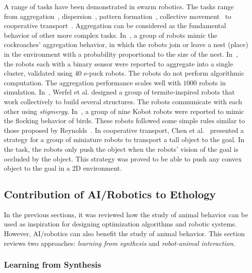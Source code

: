 A range of tasks have been demonstrated in swarm robotics. The tasks range from aggregation~\cite{Trianni:LNCS:2003, Gauci2014_ijrr, Garnier:AL:2008, Jeanson:AB:2005}, dispersion~\cite{howard2002mobile, mclurkin2004distributed}, pattern formation~\cite{Fujibayashi:DARS:2002, Chen:AAMAS:2012}, collective movement~\cite{Turgut:SI:2008} to cooperative transport~\cite{Kube:AB:1993, Kube:RAS:2000,Gross:IJBC:2009, Jianing:TRO:2015}. Aggregation can be considered as the fundamental behavior of other more complex tasks. In~\cite{Jeanson:AB:2005}, a group of robots mimic the cockroaches' aggregation behavior, in which the robots join or leave a nest (place) in the environment with a probability proportional to the size of the nest. In~\cite{Gauci2014_ijrr}, the robots each with a binary sensor were reported to aggregate into a single cluster, validated using $40$ e-puck robots. The robots do not perform algorithmic computation. The aggregation performance scales well with $1000$ robots in simulation. In~\cite{Werfel:Sci:2014}, Werfel et al. designed a group of termite-inspired robots that work collectively to build several structures. The robots communicate with each other using \textit{stigmergy}. In~\cite{Turgut:SI:2008}, a group of nine Kobot robots were reported to mimic the flocking behavior of birds. These robots followed some simple rules similar to those proposed by Reynolds~\cite{Craig:CG:1987}. In cooperative transport, Chen et al.~\cite{Jianing:TRO:2015} presented a strategy for a group of miniature robots to transport a tall object to the goal. In the task, the robots only push the object when the robots' vision of the goal is occluded by the object. This strategy was proved to be able to push any convex object to the goal in a 2D environment. 
\subsection{Contribution of AI/Robotics to Ethology}\label{sec:contribution_of_AI/robotics_to_ethology}

In the previous sections, it was reviewed how the study of animal behavior can be used as inspiration for designing optimization algorithms and robotic systems. However, AI/robotics can also benefit the study of animal behavior. This section reviews two approaches: \textit{learning from synthesis} and \textit{robot-animal interaction}.

\subsubsection{Learning from Synthesis}

